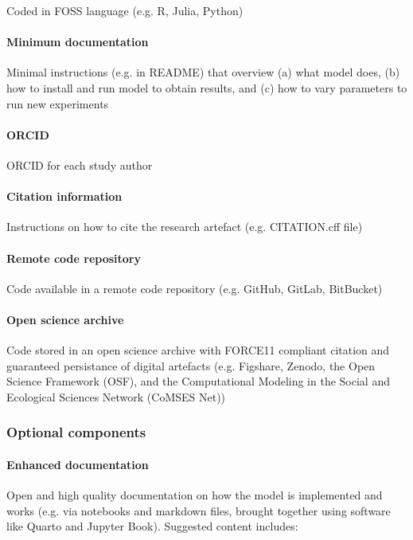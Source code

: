 \documentclass[
]{article}
\begin{document}
Coded in FOSS language (e.g. R, Julia, Python)

\paragraph{Minimum documentation}

Minimal instructions (e.g. in README) that overview (a) what model does,
(b) how to install and run model to obtain results, and (c) how to vary
parameters to run new experiments

\paragraph{ORCID}

ORCID for each study author

\paragraph{Citation information}

Instructions on how to cite the research artefact (e.g. CITATION.cff
file)

\paragraph{Remote code repository}

Code available in a remote code repository (e.g. GitHub, GitLab,
BitBucket)

\paragraph{Open science archive}

Code stored in an open science archive with FORCE11 compliant citation
and guaranteed persistance of digital artefacts (e.g. Figshare, Zenodo,
the Open Science Framework (OSF), and the Computational Modeling in the
Social and Ecological Sciences Network (CoMSES Net))

\subsubsection{Optional components}

\paragraph{Enhanced documentation}

Open and high quality documentation on how the model is implemented and
works (e.g. via notebooks and markdown files, brought together using
software like Quarto and Jupyter Book). Suggested content includes:
\end{document}

